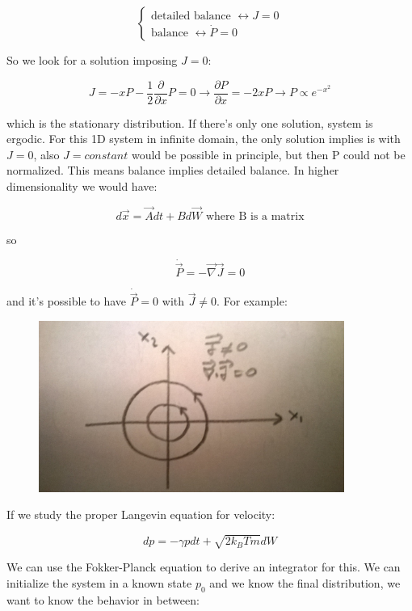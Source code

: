\documentclass[a4paper, italian, openany]{book}
\begin{document}
$$
\begin{cases}
\mbox{detailed balance } \leftrightarrow J = 0\\
\mbox{balance } \leftrightarrow \dot{P} = 0
\end{cases}
$$

So we look for a solution imposing $J=0$:

$$J = -xP -\frac{1}{2}\frac{\partial}{\partial x}P = 0 \rightarrow \frac{\partial P}{\partial x} = -2xP \rightarrow P \propto e^{-x^2}$$

which is the stationary distribution. If there's only one solution, system is ergodic.\newline
For this 1D system in infinite domain, the only solution implies is with $J=0$, also $J=constant$ would be possible in principle, but then P could not be normalized. This means balance implies detailed balance.\newline
In higher dimensionality we would have:

$$d\overrightarrow{x} = \overrightarrow{A}dt + Bd\overrightarrow{W} \mbox{ where B is a matrix}$$

so

$$\dot{\overrightarrow{P}}= -\overrightarrow{\nabla} \overrightarrow{J} = 0$$

and it's possible to have $\dot{\overrightarrow{P}}=0$ with $\overrightarrow{J} \ne 0$. For example:

\begin{figure}[H]
\centering
\includegraphics[width=100mm]{img/pic27.jpg}
\end{figure}

If we study the proper Langevin equation for velocity:

$$dp = -\gamma p dt + \sqrt{2k_B T m} dW$$

We can use the Fokker-Planck equation to derive an integrator for this. We can initialize the system in a known state $p_0$ and we know the final distribution, we want to know the behavior in between:
\end{document}
